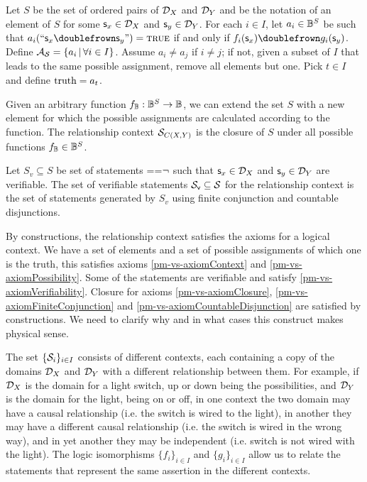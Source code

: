 \begin{mathSection}
\begin{defn}
		Let $S$ be the set of ordered pairs of $\mathcal{D}_{X}$ and $\mathcal{D}_{Y}$ and  be the notation of an element of $S$ for some $\mathsf{s}_x \in \mathcal{D}_{X}$ and $\mathsf{s}_y \in \mathcal{D}_{Y}$. For each $i \in I$, let $a_i \in \mathbb{B}^S$ be such that  $a_i(``\stmt_x \comp \stmt_y") = \TRUE$ if and only if $f_{i}(\stmt_x) \comp g_{i}(\stmt_y)$. Define $\mathcal{A}_{\mathcal{S}} = \{ a_i \, | \, \forall i \in I \}$. Assume $a_i \neq a_j$ if $i \neq j$; if not, given a subset of $I$ that leads to the same possible assignment, remove all elements but one. Pick $t \in I$ and define $\operatorname{truth} = a_t$.
		
		Given an arbitrary function $f_{\mathbb{B}} : \mathbb{B}^S \to \mathbb{B}$, we can extend the set $S$ with a new element for which the possible assignments are calculated according to the function. The relationship context $\mathcal{S}_{C(X,Y)}$ is the closure of $S$ under all possible functions $f_{\mathbb{B}} \in \mathbb{B}^S$.
		
		Let $S_v \subseteq S$ be set of statements ==$\neg$ such that $\mathsf{s}_x \in \mathcal{D}_{X}$ and $\mathsf{s}_y \in \mathcal{D}_{Y}$ are verifiable. The set of verifiable statements $\mathcal{S}_\textsf{v} \subseteq \mathcal{S}$ for the relationship context is the set of statements generated by $S_v$ using finite conjunction and countable disjunctions.
	\end{defn}
	\begin{justification}
		By constructions, the relationship context satisfies the axioms for a logical context. We have a set of elements and a set of possible assignments of which one is the truth, this satisfies axioms \ref{pm-vs-axiomContext} and \ref{pm-vs-axiomPossibility}. Some of the statements are verifiable and satisfy \ref{pm-vs-axiomVerifiability}. Closure for axioms \ref{pm-vs-axiomClosure}, \ref{pm-vs-axiomFiniteConjunction} and \ref{pm-vs-axiomCountableDisjunction} are satisfied by constructions. We need to clarify why and in what cases this construct makes physical sense.
		
		The set $\{ \mathcal{S}_i \}_{i \in I}$ consists of different contexts, each containing a copy of the domains $\mathcal{D}_X$ and $\mathcal{D}_Y$ with a different relationship between them. For example, if $\mathcal{D}_X$ is the domain for a light switch, up or down being the possibilities, and $\mathcal{D}_Y$ is the domain for the light, being on or off, in one context the two domain may have a causal relationship (i.e. the switch is wired to the light), in another they may have a different causal relationship (i.e. the switch is wired in the wrong way), and in yet another they may be independent (i.e. switch is not wired with the light). The logic isomorphisms $\{f_{i}\}_{i \in I}$ and $\{g_{i}\}_{i \in I}$ allow us to relate the statements that represent the same  assertion in the different contexts.
		

\end{justification}
\end{mathSection}
